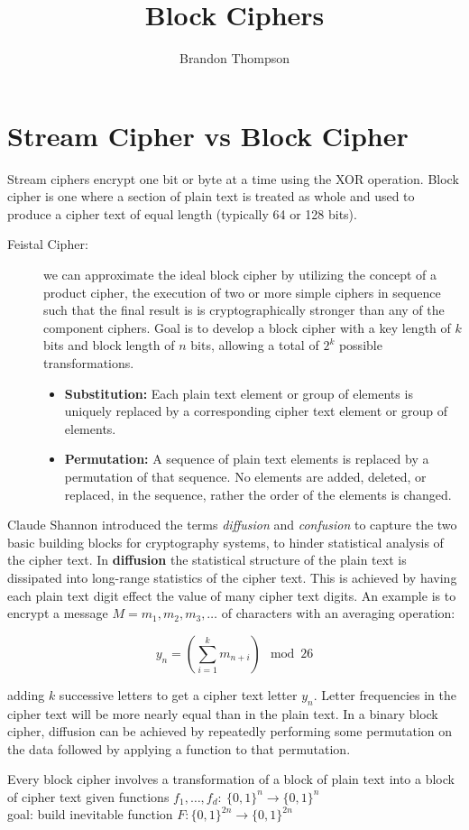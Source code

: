 \documentclass[a4paper]{article}
\begin{document}
	\author{Brandon Thompson}
	\title{Block Ciphers}
	\maketitle
	
	\section{Stream Cipher vs Block Cipher}
	Stream ciphers encrypt one bit or byte at a time using the XOR operation.
	Block cipher is one where a section of plain text is treated as whole and used
	to produce a cipher text of equal length (typically 64 or 128 bits).\\

	\begin{description}
		\item[Feistal Cipher:] we can approximate the ideal block cipher by utilizing
			the concept of a product cipher, the execution of two or more simple
			ciphers in sequence such that the final result is is cryptographically
			stronger than any of the component ciphers. Goal is to develop a block 
			cipher with a key length of $k$ bits and block length of $n$ bits,
			allowing a total of $2^{k}$ possible transformations.
			\begin{itemize}
				\item \textbf{Substitution:} Each plain text element or group
					of elements is uniquely replaced by a corresponding
					cipher text element or group of elements.
				\item \textbf{Permutation:} A sequence of plain text elements is
					replaced by a permutation of that sequence. No
					elements are added, deleted, or replaced, in the sequence,
					rather the order of the elements is changed.
			\end{itemize}
	\end{description}
	Claude Shannon introduced the terms \textit{diffusion} and \textit{confusion} to capture
	the two basic building blocks for cryptography systems, to hinder statistical analysis
	of the cipher text. In \textbf{diffusion} the statistical structure of the plain text
	is dissipated into long-range statistics of the cipher text. This is achieved by having
	each plain text digit effect the value of many cipher text digits. An example is to
	encrypt a message $M = m_1,m_2,m_3,\ldots$ of characters with an averaging operation:
	\begin{center}
		\[y_n = \left( \sum_{i=1}^{k} m_{n+i} \right)\mod26\] 
	\end{center}
	adding $k$ successive letters to get a cipher text letter $y_n$. Letter frequencies
	in  the cipher text will be more nearly equal than in the plain text. In a binary
	block cipher, diffusion can be achieved by repeatedly performing some permutation on
	the data followed by applying a function to that permutation. \par
	Every block cipher involves a transformation of a block of plain text into a block
	of cipher text
	given functions $f_1,\ldots,f_d:\ \{0,1\}^{n} \to \{0,1\}^{n}$\\
	goal: build inevitable function $F:\{0,1\}^{2n} \to \{0,1\}^{2n}$ 
\end{document}
